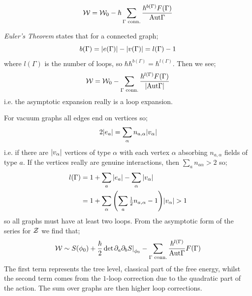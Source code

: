 \begin{equation}
\mathcal{W} = \mathcal{W}_0 - \hbar\sum_{\Gamma\,\,\text{conn.}}{\frac{\hbar^{b(\Gamma)}F(\Gamma)}{\text{Aut}\Gamma}}
\end{equation}
\begin{thm}
\emph{Euler's Theorem} states that for a connected graph;
\begin{equation}
b(\Gamma) = \abs{e(\Gamma)} - \abs{v(\Gamma)} = l(\Gamma) - 1
\end{equation}
where $l(\Gamma)$ is the number of loops, so $\hbar\hbar^{b(\Gamma)} = \hbar^{l(\Gamma)}$. Then we see;
\begin{equation*}
\mW = \mW_0 - \sum_{\Gamma\,\,\text{conn.}}{\frac{\hbar^{l(\Gamma)}F(\Gamma)}{\abs{\text{Aut}\Gamma}}}
\end{equation*}
i.e. the asymptotic expansion really is a loop expansion.
\end{thm}
For vacuum graphs all edges end on vertices so;
\begin{equation*}
2\abs{e_a} = \sum_{\alpha}{n_{a, \alpha}\abs{v_{\alpha}}}
\end{equation*} 
i.e. if there are $\abs{v_\alpha}$ vertices of type $\alpha$ with each vertex $\alpha$ absorbing $n_{a, \alpha}$ fields of type $a$. If the vertices really are genuine interactions, then $\sum_{a}{n_{a\alpha}} > 2$ so;
\begin{align*}
l(\Gamma) &= 1 + \sum_{a}{\abs{e_{a}}} - \sum_{\alpha}{\abs{v_{\alpha}}} \\
&= 1 + \sum_{\alpha}{\left(\sum_{a}{\tfrac{1}{2}n_{a, \alpha} - 1}\right)\abs{v_{\alpha}}} > 1
\end{align*}
so all graphs must have at least two loops. From the asymptotic form of the series for $\mathcal{Z}$ we find that;
\begin{equation}
\mW \sim S(\phi_0) + \frac{\hbar}{2}\det\left.\del_a \del_b S\right|_{\phi_0} - \sum_{\Gamma\,\,\text{conn.}}{\frac{\hbar^{l(\Gamma)}}{\text{Aut}\Gamma}F(\Gamma)}
\end{equation}
The first term represents the tree level, classical part of the free energy, whilst the second term comes from the $1$-loop correction due to the quadratic part of the action. The sum over graphs are then higher loop corrections.
